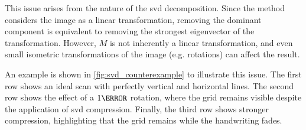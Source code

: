     \begin{toReview}
    \noindent This issue arises from the nature of the \gls{svd} decomposition. Since the method considers the image as a linear transformation, removing the dominant component is equivalent to removing the strongest eigenvector of the transformation. However, $M$ is not inherently a linear transformation, and even small isometric transformations of the image (e.g. rotations) can affect the result.

    \noindent An example is shown in \cref{fig:svd_counterexample} to illustrate this issue. The first row shows an ideal scan with perfectly vertical and horizontal lines. The second row shows the effect of a $1\degree$ rotation, where the grid remains visible despite the application of \gls{svd} compression. Finally, the third row shows stronger compression, highlighting that the grid remains while the handwriting fades.


\end{toReview}
